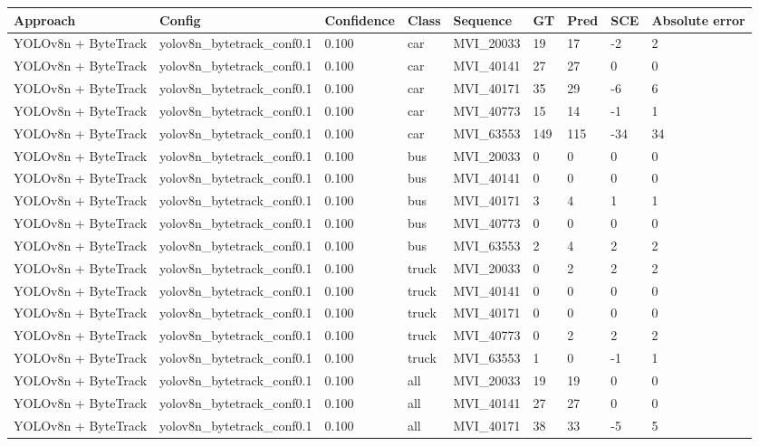 \begin{tabular}{lllllllll}
\toprule
Approach & Config & Confidence & Class & Sequence & GT & Pred & SCE & Absolute error \\
\midrule
YOLOv8n + ByteTrack & yolov8n\_bytetrack\_conf0.1 & 0.100 & car & MVI\_20033 & 19 & 17 & -2 & 2 \\
YOLOv8n + ByteTrack & yolov8n\_bytetrack\_conf0.1 & 0.100 & car & MVI\_40141 & 27 & 27 & 0 & 0 \\
YOLOv8n + ByteTrack & yolov8n\_bytetrack\_conf0.1 & 0.100 & car & MVI\_40171 & 35 & 29 & -6 & 6 \\
YOLOv8n + ByteTrack & yolov8n\_bytetrack\_conf0.1 & 0.100 & car & MVI\_40773 & 15 & 14 & -1 & 1 \\
YOLOv8n + ByteTrack & yolov8n\_bytetrack\_conf0.1 & 0.100 & car & MVI\_63553 & 149 & 115 & -34 & 34 \\
YOLOv8n + ByteTrack & yolov8n\_bytetrack\_conf0.1 & 0.100 & bus & MVI\_20033 & 0 & 0 & 0 & 0 \\
YOLOv8n + ByteTrack & yolov8n\_bytetrack\_conf0.1 & 0.100 & bus & MVI\_40141 & 0 & 0 & 0 & 0 \\
YOLOv8n + ByteTrack & yolov8n\_bytetrack\_conf0.1 & 0.100 & bus & MVI\_40171 & 3 & 4 & 1 & 1 \\
YOLOv8n + ByteTrack & yolov8n\_bytetrack\_conf0.1 & 0.100 & bus & MVI\_40773 & 0 & 0 & 0 & 0 \\
YOLOv8n + ByteTrack & yolov8n\_bytetrack\_conf0.1 & 0.100 & bus & MVI\_63553 & 2 & 4 & 2 & 2 \\
YOLOv8n + ByteTrack & yolov8n\_bytetrack\_conf0.1 & 0.100 & truck & MVI\_20033 & 0 & 2 & 2 & 2 \\
YOLOv8n + ByteTrack & yolov8n\_bytetrack\_conf0.1 & 0.100 & truck & MVI\_40141 & 0 & 0 & 0 & 0 \\
YOLOv8n + ByteTrack & yolov8n\_bytetrack\_conf0.1 & 0.100 & truck & MVI\_40171 & 0 & 0 & 0 & 0 \\
YOLOv8n + ByteTrack & yolov8n\_bytetrack\_conf0.1 & 0.100 & truck & MVI\_40773 & 0 & 2 & 2 & 2 \\
YOLOv8n + ByteTrack & yolov8n\_bytetrack\_conf0.1 & 0.100 & truck & MVI\_63553 & 1 & 0 & -1 & 1 \\
YOLOv8n + ByteTrack & yolov8n\_bytetrack\_conf0.1 & 0.100 & all & MVI\_20033 & 19 & 19 & 0 & 0 \\
YOLOv8n + ByteTrack & yolov8n\_bytetrack\_conf0.1 & 0.100 & all & MVI\_40141 & 27 & 27 & 0 & 0 \\
YOLOv8n + ByteTrack & yolov8n\_bytetrack\_conf0.1 & 0.100 & all & MVI\_40171 & 38 & 33 & -5 & 5 \\

\end{tabular}
